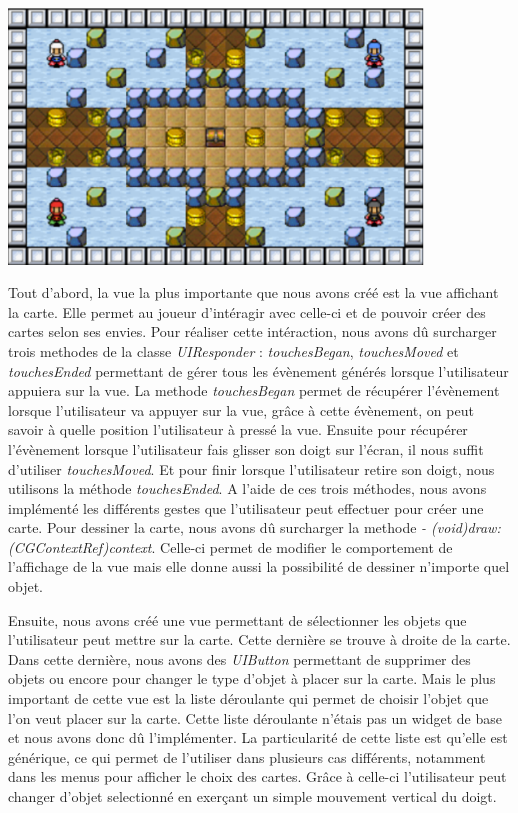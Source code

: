 		\begin{center}
			\includegraphics[width=11cm]{./Developpement/Img/carte.eps}
		\end{center}
		Tout d'abord, la vue la plus importante que nous avons créé est la vue affichant la carte. Elle permet au joueur d'intéragir avec celle-ci et de pouvoir créer des cartes selon ses envies. Pour réaliser cette intéraction, nous avons dû surcharger trois methodes de la classe \textit{UIResponder} : \textit{touchesBegan}, \textit{touchesMoved} et \textit{touchesEnded} permettant de gérer tous les évènement générés lorsque l'utilisateur appuiera sur la vue. La methode \textit{touchesBegan} permet de récupérer l'évènement lorsque l'utilisateur va appuyer sur la vue, grâce à cette évènement, on peut savoir à quelle position l'utilisateur à pressé la vue. Ensuite pour récupérer l'évènement lorsque l'utilisateur fais glisser son doigt sur l'écran, il nous suffit d'utiliser \textit{touchesMoved}. Et pour finir lorsque l'utilisateur retire son doigt, nous utilisons la méthode \textit{touchesEnded}. A l'aide de ces trois méthodes, nous avons implémenté les différents gestes que l'utilisateur peut effectuer pour créer une carte. Pour dessiner la carte, nous avons dû surcharger la methode \textit{- (void)draw:(CGContextRef)context}. Celle-ci permet de modifier le comportement de l'affichage de la vue mais elle donne aussi la possibilité de dessiner n'importe quel objet.
		
		\begin{center}
		\end{center}
			
		Ensuite, nous avons créé une vue permettant de sélectionner les objets que l'utilisateur peut mettre sur la carte. Cette dernière se trouve à droite de la carte. Dans cette dernière, nous avons des \textit{UIButton} permettant de supprimer des objets ou encore pour changer le type d'objet à placer sur la carte. Mais le plus important de cette vue est la liste déroulante qui permet de choisir l'objet que l'on veut placer sur la carte. Cette liste déroulante n'étais pas un \gls{widget} de base et nous avons donc dû l'implémenter. La particularité de cette liste est qu'elle est générique, ce qui permet de l'utiliser dans plusieurs cas différents, notamment dans les menus pour afficher le choix des cartes. Grâce à celle-ci l'utilisateur peut changer d'objet selectionné en exerçant un simple mouvement vertical du doigt.
			
